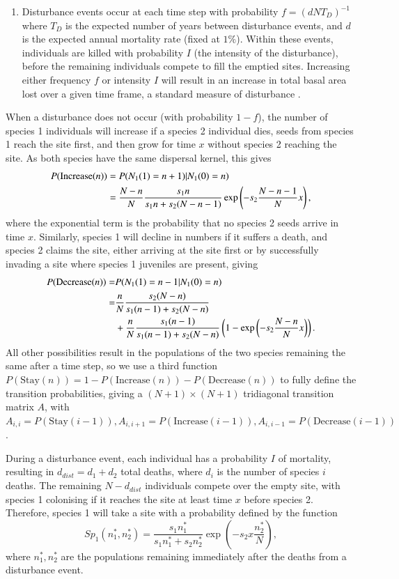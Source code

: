 \begin{enumerate}
\item Disturbance events occur at each time step with probability $f=(dNT_D)^{-1}$ where $T_D$ is the expected number of years between disturbance events, and $d$ is the expected annual mortality rate (fixed at $1\%$). Within these events, individuals are killed with probability $I$ (the intensity of the disturbance), before the remaining individuals compete to fill the emptied sites. Increasing either frequency $f$ or intensity $I$ will result in an increase in total basal area lost over a given time frame, a standard measure of disturbance \citep[e.g.][]{molino2001tree,peterson1997tornado}.
\end{enumerate}
When a disturbance does not occur (with probability $1-f$), the number of species 1 individuals will increase if a species 2 individual dies, seeds from species 1 reach the site first, and then grow for time $x$ without species 2 reaching the site. As both species have the same dispersal kernel, this gives
\begin{align}
\label{increase}
P(\text{Increase}(n))&=P(N_1(1)=n+1)|N_1(0)=n) \\
&=\frac{N-n}{N}\frac{s_1 n}{s_1 n +s_2(N-n-1)}\exp \left( -s_2 \frac{N-n-1}{N} x\right),\notag \end{align}
where the exponential term is the probability that no species 2 seeds arrive in time $x$. Similarly, species 1 will decline in numbers if it suffers a death, and species 2 claims the site, either arriving at the site first or by successfully invading a site where species 1 juveniles are present, giving
\begin{align}
\label{decrease}
P(\text{Decrease}(n))=&P(N_1(1)=n-1 | N_1(0)=n)  \\ 
=&\frac{n}{N}\frac{s_2 (N-n)}{s_1 (n-1) +s_2(N-n)} \notag \\
& + \frac{n}{N}\frac{s_1 (n-1)}{s_1 (n-1) +s_2(N-n)}\left(1-\exp \left( -s_2 \frac{N-n}{N} x\right)\right). \notag \end{align}
All other possibilities result in the populations of the two species remaining the same after a time step, so we use a third function $P(\text{Stay}(n))=1-P(\text{Increase}(n))-P(\text{Decrease}(n))$ to fully define the transition probabilities, giving a $(N+1) \times (N+1)$ tridiagonal transition matrix $A$, with $A_{i,i}=P(\text{Stay}(i-1)), A_{i,i+1}=P(\text{Increase}(i-1)), A_{i,i-1}=P(\text{Decrease}(i-1))$.

During a disturbance event, each individual has a probability $I$ of mortality, resulting in $d_{dist}=d_1+d_2$ total deaths, where $d_i$ is the number of species $i$ deaths. The remaining $N-d_{dist}$ individuals compete over the empty site, with species 1 colonising if it reaches the site at least time $x$ before species 2. Therefore, species 1 will take a site with a probability defined by the function
\begin{equation}
\label{sp1}
Sp_1(n_1^*,n_2^*)=\frac{s_1 n_1^*}{s_1n_1^*+s_2n_2^*}\exp \left(-s_2 x\frac{n_2^*}{N}\right),
\end{equation}
where $n_1^*,n_2^*$ are the populations remaining immediately after the deaths from a disturbance event.

